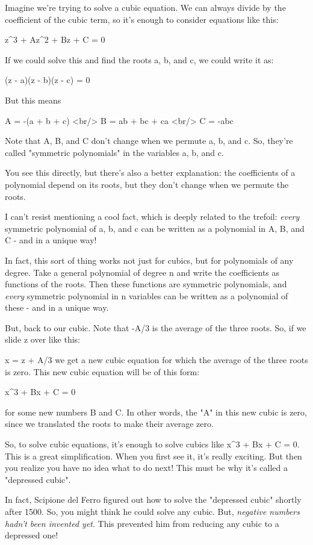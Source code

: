 Imagine we're trying to solve a cubic equation.   We can always divide 
by the coefficient of the cubic term, so it's enough to consider 
equations like this:

z^{3} + Az^{2} + Bz + C = 0

If we could solve this and find the roots a, b, and c, we could 
write it as:

(z - a)(z - b)(z - c) = 0

But this means

A = -(a + b + c)
<br/>
B = ab + bc + ca
<br/>
C = -abc

Note that A, B, and C don't change when we permute a, b, and c.
So, they're called "symmetric polynomials" in the variables a, b, 
and c.  

You see this directly, but there's also a better explanation: 
the coefficients of a polynomial depend on its roots, but they 
don't change when we permute the roots.

I can't resist mentioning a cool fact, which is deeply related to
the trefoil: \emph{every} symmetric polynomial of a, b, and c can 
be written as a polynomial in A, B, and C - and in a unique way!

In fact, this sort of thing works not just for cubics, but for 
polynomials of any degree.  Take a general polynomial of degree n 
and write the coefficients as functions of the roots.  Then these 
functions are symmetric polynomials, and \emph{every} symmetric polynomial 
in n variables can be written as a polynomial of these - and in a 
unique way.  

But, back to our cubic.  Note that -A/3 is the average of the three 
roots.  So, if we slide z over like this:

x = z + A/3
we get a new cubic equation for which the average of the three
roots is zero.  This new cubic equation will be of this form:

x^{3} + Bx + C = 0

for some new numbers B and C.  In other words, the "A" in this new
cubic is zero, since we translated the roots to make their average 
zero.

So, to solve cubic equations, it's enough to solve cubics like
x^{3} + Bx + C = 0.  This is a great simplification.  When you
first see it, it's really exciting.  But then you realize you have no
idea what to do next!  This must be why it's called a "depressed
cubic".

In fact, Scipione del Ferro figured out how to solve the "depressed
cubic" shortly after 1500.  So, you might think he could solve any 
cubic.  But, \emph{negative numbers hadn't been invented yet}.  This 
prevented him from reducing any cubic to a depressed one!  

